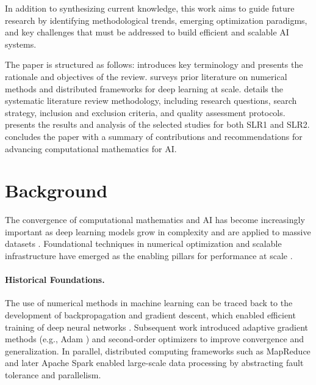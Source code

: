 \documentclass[acmsmall]{acmart}
\begin{document}
In addition to synthesizing current knowledge, this work aims to guide future research by identifying methodological trends, emerging optimization paradigms, and key challenges that must be addressed to build efficient and scalable AI systems.

The paper is structured as follows:  introduces key terminology and presents the rationale and objectives of the review.  surveys prior literature on numerical methods and distributed frameworks for deep learning at scale.  details the systematic literature review methodology, including research questions, search strategy, inclusion and exclusion criteria, and quality assessment protocols.  presents the results and analysis of the selected studies for both SLR1 and SLR2.  concludes the paper with a summary of contributions and recommendations for advancing computational mathematics for AI.

\section{Background}\label{sec:background}

The convergence of computational mathematics and AI has become increasingly important as deep learning models grow in complexity and are
applied to massive datasets \citep{thompson2020computational, najafabadi2015deep}. Foundational techniques in numerical optimization and scalable infrastructure have emerged as the
enabling pillars for performance at scale \citep{lecun2015deep,goodfellow2016deep,dean2012large}.

\paragraph{Historical Foundations.}
The use of numerical methods in machine learning can be traced back to the development of backpropagation and gradient descent, which enabled efficient training of
deep neural networks \citep{rumelhart1986learning}. Subsequent work introduced adaptive gradient methods (e.g., Adam \citep{diederik2014adam}) and second-order optimizers \citep{martens2010deep}
to improve convergence and generalization. In parallel, distributed computing frameworks such as MapReduce \citep{dean2012largemapreduce} and later Apache Spark \citep{zaharia2010spark} enabled
large-scale data processing by abstracting fault tolerance and parallelism.
\end{document}
